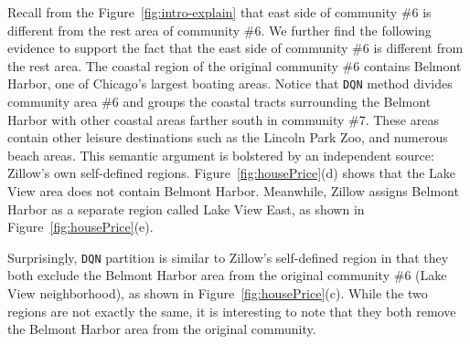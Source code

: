 Recall from the Figure~\ref{fig:intro-explain} that east side of community \#6 is different from the rest area of community \#6. We further find the following evidence to support the fact that the east side of community \#6 is different from the rest area. The coastal region of the original community \#6 contains Belmont Harbor, one of Chicago's largest boating areas. Notice that  \texttt{DQN} method divides community area \#6 and groups the coastal tracts surrounding the Belmont Harbor with other coastal areas farther south in community \#7. These areas contain other leisure destinations such as the Lincoln Park Zoo, and numerous beach areas. This semantic argument is bolstered by an independent source: Zillow's own self-defined regions. Figure~\ref{fig:housePrice}(d) shows that the Lake View area does not contain Belmont Harbor. Meanwhile, Zillow assigns Belmont Harbor as a separate region called Lake View East, as shown in Figure~\ref{fig:housePrice}(e). 


Surprisingly,  \texttt{DQN} partition is similar to Zillow's self-defined region in that they both exclude the Belmont Harbor area from the original community \#6 (Lake View neighborhood), as shown in Figure~\ref{fig:housePrice}(c). While the two regions are not exactly the same, it is interesting to note that they both remove the Belmont Harbor area from the original community.



